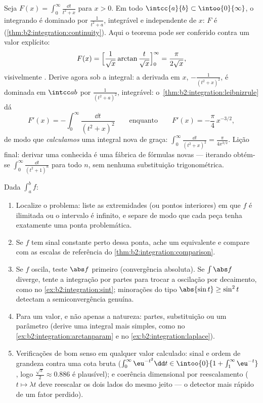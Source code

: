 \begin{example}\label{ex:b2:integration:arctanparam}
Seja $F(x) = \displaystyle\int_0^\infty \frac{\dd t}{t^2 + x}$
para $x > 0$. Em todo $\intcc{a}{b} \subset \intoo{0}{\infty}$,
o integrando é dominado por $\frac{1}{t^2 + a}$, integrável
e independente de $x$: $F$ é 
(\cref{thm:b2:integration:continuity}). Aqui o teorema pode ser
conferido contra um valor explícito:
\[
F(x) = \Bigl[\frac{1}{\sqrt x}\arctan\frac{t}{\sqrt
x}\Bigr]_0^\infty = \frac{\pi}{2\sqrt x} ,
\]
visivelmente . Derive agora sob a integral: a
derivada em $x$, $-\frac{1}{(t^2+x)^2}$, é dominada em
$\intcc ab$ por $\frac{1}{(t^2+a)^2}$, integrável:
o~\cref{thm:b2:integration:leibnizrule} dá
\[
F'(x) = -\int_0^\infty \frac{\dd t}{(t^2 + x)^2}
\qquad\text{enquanto}\qquad
F'(x) = -\frac{\pi}{4}\,x^{-3/2} ,
\]
de modo que \emph{calculamos} uma integral nova de graça:
$\int_0^\infty\frac{\dd t}{(t^2+x)^2} = \frac{\pi}{4x^{3/2}}$.
Lição final: derivar uma  conhecida é uma
fábrica de fórmulas novas --- iterando obtém-se
$\int_0^\infty\frac{\dd t}{(t^2+1)^n}$ para todo $n$, sem nenhuma
substituição trigonométrica.
\end{example}

\begin{method}\label{met:b2:integration:study}
Dada $\int_a^b f$:
\begin{enumerate}
  \item Localize o problema: liste as extremidades (ou pontos
        interiores) em que $f$ é ilimitada ou o intervalo é
        infinito, e separe de modo que cada peça tenha exatamente uma
        ponta problemática.
  \item Se $f$ tem sinal constante perto dessa ponta, ache um
        equivalente e compare com as escalas de referência do
        \cref{thm:b2:integration:comparison}.
  \item Se $f$ oscila, teste $\abs f$ primeiro (convergência
        absoluta). Se $\int\abs f$ diverge, tente a integração
        por partes para trocar a oscilação por decaimento, como no
        \cref{ex:b2:integration:sint}; minorações do tipo
        $\abs{\sin t} \geq \sin^2t$ detectam a
        semiconvergência genuína.
  \item Para um valor, e não apenas a natureza: partes, substituição
        ou um parâmetro (derive uma integral mais simples, como no
        \cref{ex:b2:integration:arctanparam} e no
        \cref{ex:b2:integration:laplace}).
  \item Verificações de bom senso em qualquer valor calculado: sinal e ordem de
        grandeza contra uma cota bruta ($\int_0^\infty
        \eu^{-t^2}\dd t \in \intoo{0}{1 + \int_1^\infty
        \eu^{-t}}$, logo $\frac{\sqrt\pi}{2} \approx 0.886$ é
        plausível); e coerência dimensional por reescalamento
        ($t \mapsto \lambda t$ deve reescalar os dois lados do mesmo
        jeito --- o detector mais rápido de um fator perdido).
\end{enumerate}
\end{method}

